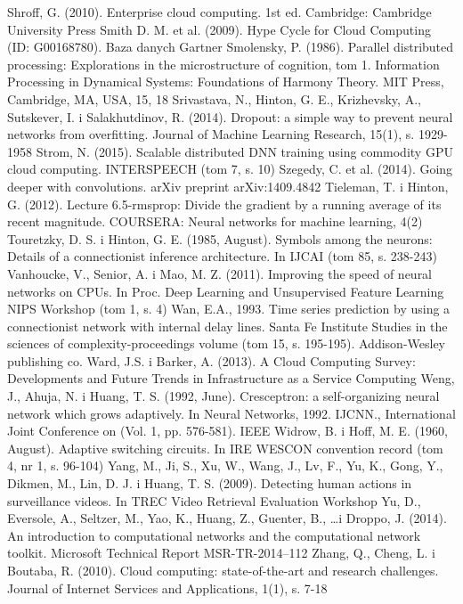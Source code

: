 \documentclass[12pt,a4paper,twoside]{article}
\begin{document}
\begin{thebibliography}{99}
 Shroff, G. (2010). Enterprise cloud computing. 1st ed. Cambridge: Cambridge University Press
 Smith D. M. et al. (2009). Hype Cycle for Cloud Computing (ID: G00168780). Baza danych Gartner
 Smolensky, P. (1986). Parallel distributed processing: Explorations in the microstructure of cognition, tom 1. Information Processing in Dynamical Systems: Foundations of Harmony Theory. MIT Press, Cambridge, MA, USA, 15, 18
 Srivastava, N., Hinton, G. E., Krizhevsky, A., Sutskever, I. i Salakhutdinov, R. (2014). Dropout: a simple way to prevent neural networks from overfitting. Journal of Machine Learning Research, 15(1), s. 1929-1958
 Strom, N. (2015). Scalable distributed DNN training using commodity GPU cloud computing. INTERSPEECH (tom 7, s. 10)
 Szegedy, C. et al. (2014). Going deeper with convolutions. arXiv preprint arXiv:1409.4842
 Tieleman, T. i Hinton, G. (2012). Lecture 6.5-rmsprop: Divide the gradient by a running average of its recent magnitude. COURSERA: Neural networks for machine learning, 4(2)
 Touretzky, D. S. i Hinton, G. E. (1985, August). Symbols among the neurons: Details of a connectionist inference architecture. In IJCAI (tom 85, s. 238-243)
 Vanhoucke, V., Senior, A. i Mao, M. Z. (2011). Improving the speed of neural networks on CPUs. In Proc. Deep Learning and Unsupervised Feature Learning NIPS Workshop (tom 1, s. 4)
 Wan, E.A., 1993. Time series prediction by using a connectionist network with internal delay lines. Santa Fe Institute Studies in the sciences of complexity-proceedings volume (tom 15, s. 195-195). Addison-Wesley publishing co.
 Ward, J.S. i Barker, A. (2013). A Cloud Computing Survey: Developments and Future Trends in Infrastructure as a Service Computing
 Weng, J., Ahuja, N. i Huang, T. S. (1992, June). Cresceptron: a self-organizing neural network which grows adaptively. In Neural Networks, 1992. IJCNN., International Joint Conference on (Vol. 1, pp. 576-581). IEEE
 Widrow, B. i Hoff, M. E. (1960, August). Adaptive switching circuits. In IRE WESCON convention record (tom 4, nr 1, s. 96-104)
 Yang, M., Ji, S., Xu, W., Wang, J., Lv, F., Yu, K., Gong, Y., Dikmen, M., Lin, D. J. i Huang, T. S. (2009). Detecting human actions in surveillance videos. In TREC Video Retrieval Evaluation Workshop
 Yu, D., Eversole, A., Seltzer, M., Yao, K., Huang, Z., Guenter, B., \ldots i Droppo, J. (2014). An introduction to computational networks and the computational network toolkit. Microsoft Technical Report MSR-TR-2014–112
 Zhang, Q., Cheng, L. i Boutaba, R. (2010). Cloud computing: state-of-the-art and research challenges. Journal of Internet Services and Applications, 1(1), s. 7-18


\end{thebibliography}
\end{document}
